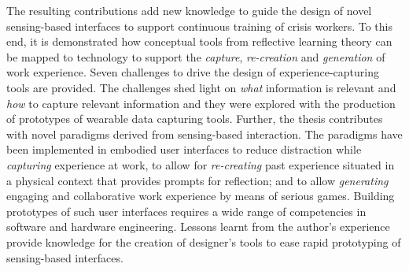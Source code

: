 The resulting contributions add new knowledge to guide the design of novel sensing-based interfaces to support continuous training of crisis workers. To this end, it is demonstrated how conceptual tools from reflective learning theory can be mapped to technology to support the \emph{capture}, \emph{re-creation} and \emph{generation} of work experience. Seven challenges to drive the design of experience-capturing tools are provided. The challenges shed light on \emph{what} information is relevant and \emph{how} to capture relevant information and they were explored with the production of prototypes of wearable data capturing tools. Further, the thesis contributes with novel paradigms derived from sensing-based interaction. The paradigms have been implemented in embodied user interfaces to reduce distraction while \emph{capturing} experience at work, to allow for \emph{re-creating} past experience situated in a physical context that provides prompts for reflection; and to allow \emph{generating} engaging and collaborative work experience by means of serious games. Building prototypes of such user interfaces requires a wide range of competencies in software and hardware engineering. Lessons learnt from the author's experience provide knowledge for the creation of designer's tools to ease rapid prototyping of sensing-based interfaces.
